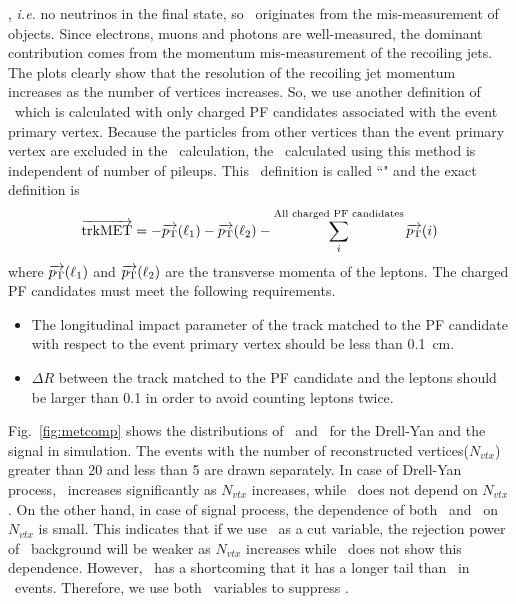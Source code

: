 \met, \textit{i.e.} no neutrinos in the final state, so \met\ originates from 
the mis-measurement of objects. Since electrons, muons 
and photons are well-measured, the dominant contribution comes from the momentum 
mis-measurement of the recoiling jets. The plots clearly show that the resolution 
of the recoiling jet momentum increases as the number of vertices increases.   
So, we use another definition of \met\ which is calculated with only charged 
PF candidates associated with the event primary vertex. Because the particles from 
other vertices than the event primary vertex are excluded in the \met\ calculation,
the \met\ calculated using this method is independent of number of pileups.  
This \met\ definition is called ``\trkmet" and the exact definition is
\begin{eqnarray} 
\overrightarrow{\mathrm{trkMET}} 
= 
- \overrightarrow{p_\mathrm{T}} (\ell_1)  
- \overrightarrow{p_\mathrm{T}} (\ell_2)  
- \sum^{\textrm{All charged PF candidates}}_i \overrightarrow{p_\mathrm{T}}(i)
\end{eqnarray} 
where $\overrightarrow{p_\mathrm{T}} (\ell_1)$ and $\overrightarrow{p_\mathrm{T}} (\ell_2)$
are the transverse momenta of the leptons. The charged PF candidates must 
meet the following requirements.
\begin{itemize}
\item The longitudinal impact parameter of the track matched to the PF candidate 
      with respect to the event primary vertex should be less than 0.1~cm. 
\item $\Delta R$ between the track matched to the PF candidate and the leptons 
      should be larger than 0.1 in order to avoid counting leptons twice. 
\end{itemize}

Fig.~\ref{fig:metcomp} shows the distributions of \pfmet\ and \trkmet\ 
for the Drell-Yan and the signal in simulation. The events with the number 
of reconstructed vertices($N_{vtx}$) greater than 20 and less than 5 
are drawn separately. In case of Drell-Yan process, \pfmet\ increases 
significantly as $N_{vtx}$ increases, while \trkmet\ does not depend 
on $N_{vtx}$. 
On the other hand, in case of signal process, the dependence 
of both \pfmet\ and \trkmet\ on $N_{vtx}$ is small. 
This indicates that if we use \pfmet\ as a cut variable, 
the rejection power of \dyll\ background will be weaker 
as $N_{vtx}$ increases while \trkmet\ does not show this 
dependence. However, \trkmet\ has a shortcoming that it has 
a longer tail than \pfmet\ in \dyll\ events. 
Therefore, we use both \met\ variables to suppress \dyll.

